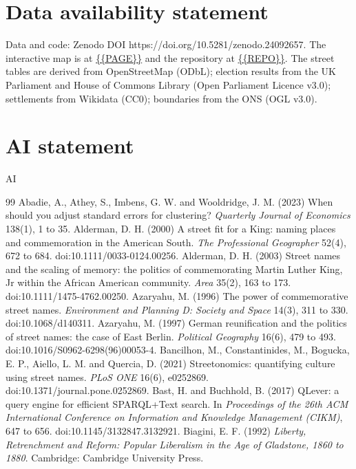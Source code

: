 \documentclass[11pt,a4paper]{article}
\begin{document}
\section*{Data availability statement}
Data and code: Zenodo DOI https://doi.org/10.5281/zenodo.24092657. The interactive map is at \url{{{PAGE}}} and the repository at \url{{{REPO}}}. The street tables are derived from OpenStreetMap (ODbL); election results from the UK Parliament and House of Commons Library (Open Parliament Licence v3.0); settlements from Wikidata (CC0); boundaries from the ONS (OGL v3.0).

\section*{AI statement}
{{AI}}

\begin{thebibliography}{99}
 Abadie, A., Athey, S., Imbens, G. W. and Wooldridge, J. M. (2023) When should you adjust standard errors for clustering? \textit{Quarterly Journal of Economics} 138(1), 1 to 35.
 Alderman, D. H. (2000) A street fit for a King: naming places and commemoration in the American South. \textit{The Professional Geographer} 52(4), 672 to 684. doi:10.1111/0033-0124.00256.
 Alderman, D. H. (2003) Street names and the scaling of memory: the politics of commemorating Martin Luther King, Jr within the African American community. \textit{Area} 35(2), 163 to 173. doi:10.1111/1475-4762.00250.
 Azaryahu, M. (1996) The power of commemorative street names. \textit{Environment and Planning D: Society and Space} 14(3), 311 to 330. doi:10.1068/d140311.
 Azaryahu, M. (1997) German reunification and the politics of street names: the case of East Berlin. \textit{Political Geography} 16(6), 479 to 493. doi:10.1016/S0962-6298(96)00053-4.
 Bancilhon, M., Constantinides, M., Bogucka, E. P., Aiello, L. M. and Quercia, D. (2021) Streetonomics: quantifying culture using street names. \textit{PLoS ONE} 16(6), e0252869. doi:10.1371/journal.pone.0252869.
 Bast, H. and Buchhold, B. (2017) QLever: a query engine for efficient SPARQL+Text search. In \textit{Proceedings of the 26th ACM International Conference on Information and Knowledge Management (CIKM)}, 647 to 656. doi:10.1145/3132847.3132921.
 Biagini, E. F. (1992) \textit{Liberty, Retrenchment and Reform: Popular Liberalism in the Age of Gladstone, 1860 to 1880}. Cambridge: Cambridge University Press.

\end{thebibliography}
\end{document}
